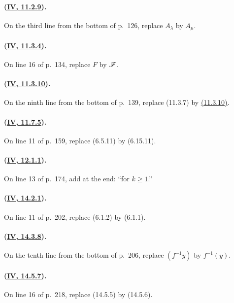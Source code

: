 \paragraph{({\texorpdfstring{\protect\hyperref[IV.11.2.9]{IV, 11.2.9}}{IV, 11.2.9}}).}
On the third line from the bottom of p.~126, replace $A_\lambda$ by
$A_\mu$.

\paragraph{({\texorpdfstring{\protect\hyperref[IV.11.3.4]{IV, 11.3.4}}{IV, 11.3.4}}).}
On line 16 of p.~134, replace $F$ by $\mathscr{F}$.

\paragraph{({\texorpdfstring{\protect\hyperref[IV.11.3.10]{IV, 11.3.10}}{IV, 11.3.10}}).}
On the ninth line from the bottom of p.~139, replace (11.3.7) by
{\hyperref[IV.11.3.10]{(11.3.10)}}.

\paragraph{({\texorpdfstring{\protect\hyperref[IV.11.7.5]{IV, 11.7.5}}{IV, 11.7.5}}).}
On line 11 of p.~159, replace (6.5.11) by (6.15.11).

\paragraph{({\texorpdfstring{\protect\hyperref[IV.12.1.1]{IV, 12.1.1}}{IV, 12.1.1}}).}
On line 13 of p.~174, add at the end: ``for $k\geq 1$.''

\paragraph{({\texorpdfstring{\protect\hyperref[IV.14.2.1]{IV, 14.2.1}}{IV, 14.2.1}}).}
On line 11 of p.~202, replace (6.1.2) by (6.1.1).

\paragraph{({\texorpdfstring{\protect\hyperref[IV.14.3.8]{IV, 14.3.8}}{IV, 14.3.8}}).}
On the tenth line from the bottom of p.~206, replace $(f^{-1}y)$ by
$f^{-1}(y)$.

\paragraph{({\texorpdfstring{\protect\hyperref[IV.14.5.7]{IV, 14.5.7}}{IV, 14.5.7}}).}
On line 16 of p.~218, replace (14.5.5) by (14.5.6).

